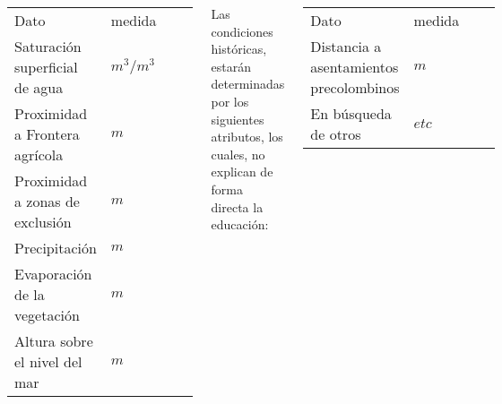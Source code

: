 \documentclass[20pt,margin=1in,innermargin=-4.5in,blockverticalspace=-0.25in]{tikzposter}
\begin{document}
\begin{columns}
{\begin{center}
\centering
\begin{tabular}{llll}
Dato & medida &    \\
Saturación superficial de agua  & $m^3/m^3$ \\
Proximidad a Frontera agrícola  & $m$ \\
Proximidad a zonas de exclusión    & $m$      \\
Precipitación  & $m$      \\
Evaporación de la vegetación   & $m$ \\
Altura sobre el nivel del mar   & $m$  \\
\end{tabular}
\end{center}

Las condiciones históricas, estarán determinadas por los siguientes atributos, los cuales, no explican de forma directa la educación:
\begin{center}
\centering
\begin{tabular}{llll}
Dato & medida &    \\
Distancia a asentamientos precolombinos & $m$ \\
En búsqueda de otros  & $etc$ \\
\end{tabular}
\end{center}
}
\end{columns}
\end{document}
